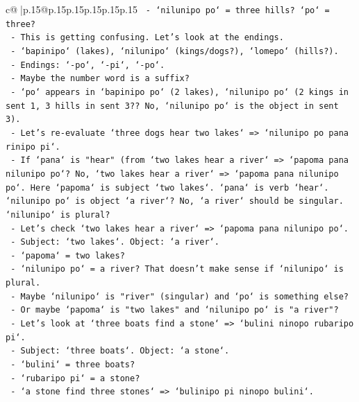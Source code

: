 \documentclass{article}
\begin{document}
{\begin{supertabular}{c@{$\;$}|p{.15\linewidth}@{}p{.15\linewidth}p{.15\linewidth}p{.15\linewidth}p{.15\linewidth}p{.15\linewidth}}
{{{\texttt{           {-} `nilunipo po` = three hills? `po` = three?} \\
\texttt{           {-} This is getting confusing. Let's look at the endings.} \\
\texttt{           {-} `bapinipo` (lakes), `nilunipo` (kings/dogs?), `lomepo` (hills?).} \\
\texttt{           {-} Endings: `{-}po`, `{-}pi`, `{-}po`.} \\
\texttt{           {-} Maybe the number word is a suffix?} \\
\texttt{           {-} `po` appears in `bapinipo po` (2 lakes), `nilunipo po` (2 kings in sent 1, 3 hills in sent 3?? No, `nilunipo po` is the object in sent 3).} \\
\texttt{           {-} Let's re{-}evaluate `three dogs hear two lakes` => `nilunipo po pana rinipo pi`.} \\
\texttt{             {-} If `pana` is "hear" (from `two lakes hear a river` => `papoma pana nilunipo po`? No, `two lakes hear a river` => `papoma pana nilunipo po`. Here `papoma` is subject `two lakes`. `pana` is verb `hear`. `nilunipo po` is object `a river`? No, `a river` should be singular. `nilunipo` is plural?} \\
\texttt{             {-} Let's check `two lakes hear a river` => `papoma pana nilunipo po`.} \\
\texttt{               {-} Subject: `two lakes`. Object: `a river`.} \\
\texttt{               {-} `papoma` = two lakes?} \\
\texttt{               {-} `nilunipo po` = a river? That doesn't make sense if `nilunipo` is plural.} \\
\texttt{               {-} Maybe `nilunipo` is "river" (singular) and `po` is something else?} \\
\texttt{               {-} Or maybe `papoma` is "two lakes" and `nilunipo po` is "a river"?} \\
\texttt{               {-} Let's look at `three boats find a stone` => `bulini ninopo rubaripo pi`.} \\
\texttt{                 {-} Subject: `three boats`. Object: `a stone`.} \\
\texttt{                 {-} `bulini` = three boats?} \\
\texttt{                 {-} `rubaripo pi` = a stone?} \\
\texttt{               {-} `a stone find three stones` => `bulinipo pi ninopo bulini`.} \\
}}}
\end{supertabular}}
\end{document}
